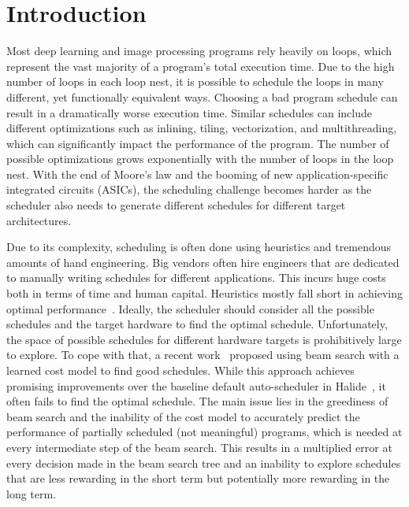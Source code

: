 \section{Introduction}
Most deep learning and image processing programs rely heavily on loops, which represent the vast majority of a program's total execution time. Due to the high number of loops in each loop nest, it is possible to schedule the loops in many different, yet functionally equivalent ways. Choosing a bad program schedule can result in a dramatically worse execution time. Similar schedules can include different optimizations such as inlining, tiling, vectorization, and multithreading, which can significantly impact the performance of the program. The number of possible optimizations grows exponentially with the number of loops in the loop nest. With the end of Moore's law and the booming of new application-specific integrated circuits (ASICs), the scheduling challenge becomes harder as the scheduler also needs to generate different schedules for different target architectures.

Due to its complexity, scheduling is often done using heuristics and tremendous amounts of hand engineering. Big vendors often hire engineers that are dedicated to manually writing schedules for different applications. This incurs huge costs both in terms of time and human capital. Heuristics mostly fall short in achieving optimal performance~\cite{cummins2017synthesizing,haj2020autophase,haj2020neurovectorizer}. Ideally, the scheduler should consider all the possible schedules and the target hardware to find the optimal schedule. Unfortunately,  the space of possible schedules for different hardware targets is prohibitively large to explore. To cope with that, a recent work~\cite{adams2019learning} proposed using beam search with a learned cost model to find good schedules. While this approach achieves promising improvements over the baseline default auto-scheduler in Halide~\cite{ragan2013halide}, it often fails to find the optimal schedule. The main issue lies in the greediness of beam search and the inability of the cost model to accurately predict the performance of partially scheduled (not meaningful) programs, which is needed at every intermediate step of the beam search. This results in a multiplied error at every decision made in the beam search tree and an inability to explore schedules that are less rewarding in the short term but potentially more rewarding in the long term.

